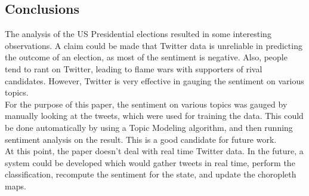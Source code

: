\documentclass[twoside]{article}
\begin{document}
\begin{multicols}{2}
\section{Conclusions}
The analysis of the US Presidential elections resulted in some interesting observations. A claim could be made that Twitter data is unreliable in predicting the outcome of an election, as most of the sentiment is negative. Also, people tend to rant on Twitter, leading to flame wars with supporters of rival candidates. However, Twitter is very effective in gauging the sentiment on various topics. \\

For the purpose of this paper, the sentiment on various topics was gauged by manually looking at the tweets, which were used for training the data. This could be done automatically by using a Topic Modeling algorithm, and then running sentiment analysis on the result. This is a good candidate for future work. \\

At this point, the paper doesn't deal with real time Twitter data. In the future, a system could be developed which would gather tweets in real time, perform the classification, recompute the sentiment for the state, and update the choropleth maps. 


\end{multicols}
\end{document}
